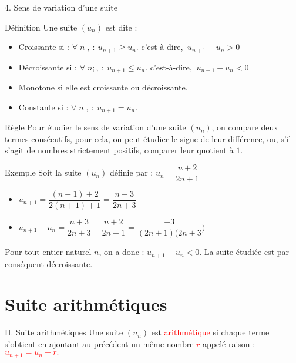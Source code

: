 \documentclass{beamer}
\begin{document}
\begin{frame}{4. Sens de variation d'une suite}
    \begin{block}{Définition}
        Une suite $\left(u_{n}\right)$ est dite :
        \begin{itemize}
            \item Croissante si : $\forall\;n\;,\ :\ u_{n+1}\geq u_{n} .$ c'est-à-dire, $\ u_{n+1}- u_{n}>0$
            \item Décroissante si : $\forall\;n;,\ :\ u_{n+1}\leq u_{n}$. c'est-à-dire, $\ u_{n+1}- u_{n}<0$
            \item Monotone si elle est croissante ou décroissante.
            \item Constante si : $\forall\;n\;,\ :\ u_{n+1}=u_{n}.$
        \end{itemize}
    \end{block}
    \begin{block}{Règle}
        Pour étudier le sens de variation d'une suite $\left(u_{n}\right)$, on compare deux termes consécutifs, pour cela, on peut étudier le signe de leur différence, ou, s'il s'agit de nombres strictement positifs, comparer leur quotient à $1.$
    \end{block}
    \begin{exampleblock}{Exemple}
        Soit la suite $\left(u_{n}\right)$ définie par : $u_{n}=\dfrac{n+2}{2n+1}$
        \begin{itemize}
            \item $u_{n+1}=\dfrac{(n+1)+2}{2(n+1)+1}=\dfrac{n+3}{2n+3}$
            \item $u_{n+1}-u_{n}=\dfrac{n+3}{2n+3}-\dfrac{n+2}{2n+1}=\dfrac{-3}{(2n+1)(2n+3})$
        \end{itemize}
        Pour tout entier naturel $n$, on a donc : $u_{n+1}-u_{n} < 0.$
        La suite étudiée est par conséquent décroissante.
    \end{exampleblock}
\end{frame}

\section{Suite arithmétiques}
\begin{frame}{II. Suite arithmétiques}
    Une suite $\left(u_{n}\right)$ est \textcolor{red}{arithmétique} si chaque terme s'obtient en ajoutant au précédent un même nombre \textcolor{red}{$r$} appelé raison : 
    \textcolor{red}{$u_{n+1}=u_{n}+r.$}
\end{frame}
\end{document}
